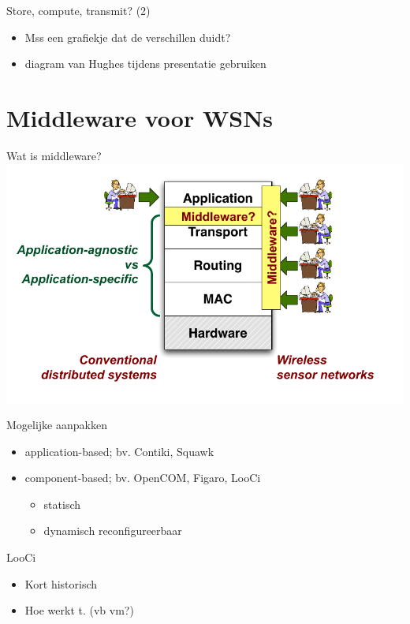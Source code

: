 \documentclass[presentation, bigger]{beamer}
\begin{document}
\begin{frame}[label=sec-1-7]{Store, compute, transmit? (2)}
\begin{itemize}
\item Mss een grafiekje dat de verschillen duidt?
\item diagram van Hughes tijdens presentatie gebruiken
\end{itemize}
\end{frame}
\section{Middleware voor WSNs}
\label{sec-2}
\begin{frame}[label=sec-2-1]{Wat is middleware?}
\includegraphics[width=\textwidth,keepaspectration=true]{middleware}
\end{frame}

\begin{frame}[label=sec-2-2]{Mogelijke aanpakken}
\begin{itemize}
\item application-based; bv. Contiki, Squawk
\item component-based; bv. OpenCOM, Figaro, LooCi
\begin{itemize}
\item statisch
\item dynamisch reconfigureerbaar
\end{itemize}
\end{itemize}
\end{frame}

\begin{frame}[label=sec-2-3]{LooCi}
\begin{itemize}
\item Kort historisch
\item Hoe werkt t. (vb vm?)
\end{itemize}
\end{frame}
\end{document}
